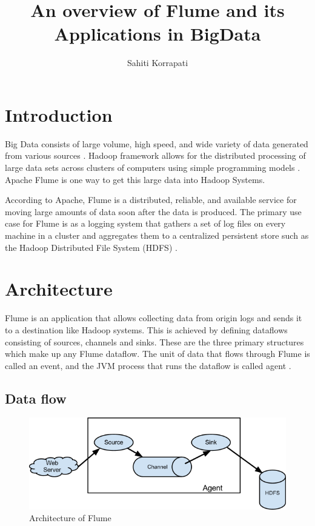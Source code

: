 \documentclass[9pt,twocolumn,twoside]{styles/osajnl}
\title{An overview of Flume and its Applications in BigData }
\author[1,*]{Sahiti Korrapati}
\affil[1]{School of Informatics and Computing, Bloomington, IN 47408, U.S.A.}
\affil[*]{Corresponding authors: sakorrap@iu.edu, S17-IR-2013}
\begin{document}
\maketitle

\section{Introduction}

Big Data consists of large volume, high speed, and wide variety of data generated from various sources \cite{tutorialspoint}. Hadoop framework allows for the distributed processing of large data sets across clusters of computers using simple programming models \cite{hadoop}. Apache Flume is one way to get this large data into Hadoop Systems.

According to Apache, Flume is a distributed, reliable, and available service for moving large amounts of data soon after the data is produced. The primary use case for Flume is as a logging system that gathers a set of log files on every machine in a cluster and aggregates them to a centralized persistent store such as the Hadoop Distributed File System (HDFS) \cite{user-manual}.

\section{Architecture}

Flume is an application that allows collecting data from origin logs and sends it to a destination like Hadoop systems. This is achieved by defining dataflows consisting of sources, channels and sinks. These are the three primary structures which make up any Flume dataflow. The  unit of data that flows through Flume is called an event, and the JVM process that runs the dataflow is called agent \cite{user-manual}.

\subsection{Data flow}

\begin{figure}[htbp]
\centering
\includegraphics[width=\linewidth]{images/FlumeArchitecture.png}
\caption{Architecture of Flume \cite{user-manual}}
\label{fig:FA}
\end{figure}
\end{document}
